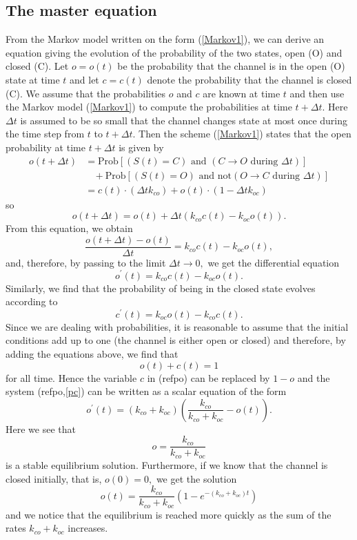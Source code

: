 \subsection{The master equation}
\label{master_equation}

From the Markov model written on the form (\ref{Markov1}), we can derive an equation
giving the evolution of the probability of the two states, open (O) and closed (C). Let $o=o(t)$ be the
probability that the channel is in the open (O) state at time $t$ and let $c=c(t)$ denote
the probability that the channel is closed (C). We assume that the probabilities $o$ and $c$ are known at time
$t$ and then use the Markov model (\ref{Markov1}) to compute the probabilities at time $t+\Delta t$.
 Here $\Delta t$ is assumed to be so small that the channel changes state at most once during the time step from $t$ to $t+\Delta t$.   Then the scheme (\ref{Markov1}) states that
the open probability at time $t+\Delta t$ is given by
\begin{align}
o(t+\Delta t) &= \text{Prob}\left[  (S(t)=C)  \mbox{\ and\ }  (C\rightarrow O \mbox{\ during\ } \Delta t)  \right] \\
& \ \ \ \ + \text{Prob}\left[  (S(t)=O)  \mbox{\ and not}  (O\rightarrow C \mbox{\ during\ } \Delta t)  \right] \\
&= c(t) \cdot (\Delta t k_{co}) + o(t) \cdot (1 -\Delta t k_{oc})
\end{align}
so
\[
o(t+\Delta t)=o(t)+\Delta t ( k_{co}c(t)-k_{oc}o(t)).
\]
From this equation, we obtain
\[
\frac{o(t+\Delta t)-o(t)}{\Delta t}=k_{co}c(t)-k_{oc}o(t),
\]
and, therefore, by passing to the limit $\Delta t\rightarrow0,$ we get the
differential equation
\begin{equation}
o^{\prime}(t)=k_{co}c(t)-k_{oc}o(t).\label{po}
\end{equation}
Similarly, we find that the probability of being in the closed state evolves
according to
\begin{equation}
c^{\prime}(t)=k_{oc}o(t)-k_{co}c(t).\label{pc}
\end{equation}
Since we are dealing with probabilities, it is reasonable to assume that the
initial conditions add up to one (the channel is either open or closed) and therefore, by adding the equations
above, we find that
\[
o(t)+c(t)=1
\]
for all time. Hence the variable $c$ in (ref{po}) can be
replaced by $1-o$ and the system (ref{po},\ref{pc}) can be
written as a scalar equation of the form
\begin{equation}
o^{\prime}(t)=\left(  k_{co}+k_{oc}\right)  \left(  \frac{k_{co}}
{k_{co}+k_{oc}}-o\left(  t\right)  \right)  .\label{po2}
\end{equation}
Here we see that
\[
o=\frac{k_{co}}{k_{co}+k_{oc}}
\]
is a stable equilibrium solution. Furthermore, if we know that the channel is
closed initially, that is, $o(0)=0,$ we get the solution
\[
o(t)=\frac{k_{co}}{k_{co}+k_{oc}}\left(  1-e^{-\left(  k_{co}+k_{oc}\right)
t}\right)
\]
and we notice that the equilibrium is reached more quickly as the sum of the rates
$k_{co}+k_{oc}$ increases.

